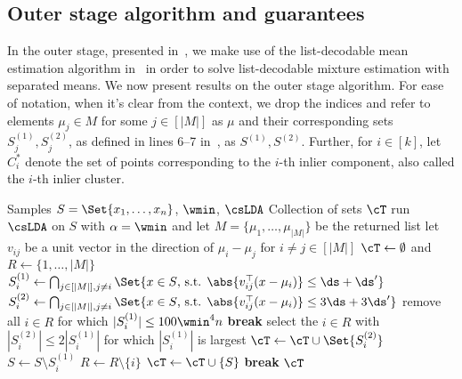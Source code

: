 \subsection{Outer stage algorithm and guarantees}
\label{sec:outer_stage_formulated}
In the outer stage, presented in~, we make use of the list-decodable mean estimation algorithm in~ in order to solve list-decodable mixture estimation with separated means. We now present results on the outer stage algorithm. 
For ease of notation, when it's clear from the context, we drop the indices and refer to elements $\mu_j \in M$ for some $j\in [|M|]$ as $\mu$ and their corresponding sets $S_j^{(1)}, S_j^{(2)}$, as defined in lines 6--7 in~, as $S^{(1)}, S^{(2)}$. 
Further, for \(i \in [k]\), let \(C_i^*\) denote the set of points corresponding to the \(i\)-th inlier component, also called the $i$-th inlier cluster.

\begin{algorithm}[t]
\caption{\(\operatorname{OuterStage}\)}
\label{alg:second_stage_pruning}
    \begin{algorithmic}[1]
        \Require Samples $S = \Set{x_1, \ldots, x_{n}}$, \(\wmin\), \(\csLDA\)
        \Ensure Collection of sets \(\cT\)
        \State run~\(\csLDA\) on $S$ with $\alpha=\wmin$ and let $M=\{\mu_1,\dots,\mu_{|M|}\}$ be the returned list
        \State let \(v_{ij}\) be a unit vector in the direction of \(\mu_i - \mu_j\) for \(i \neq j \in [|M|]\)
        \State $\cT \gets \emptyset$ and $R \gets \{1, \ldots, |M|\}$
                \State $S_{i}^{(1)} \gets \bigcap_{j \in [|M|], j \neq i}\Set{x \in S \text{, s.t. } \abs{v_{ij}^{\top}(x - \mu_i)} \leq \ds+\ds'}$
                \State $S_{i}^{(2)} \gets \bigcap_{j \in [|M|], j \neq i}\Set{x \in S \text{, s.t. } \abs{v_{ij}^{\top}(x - \mu_i)} \leq  3\ds + 3\ds'}$
            \EndFor
            \State remove all $i \in R$ for which $|S_i^{(1)}| \leq 100 \wmin^4 n$
             \textbf{break}
            \EndIf
                \State select the $i \in R$ with $|S_i^{(2)}| \leq 2|S_i^{(1)}|$ for which $|S_i^{(1)}|$ is largest
                \State \(\cT \gets \cT \cup \Set{S_i^{(2)}}\)
                \State $S \gets S \setminus S_i^{(1)}$
                \State $R \gets R \setminus \{i\}$
            \Else
                \State \(\cT \gets \cT \cup \{S\}\)
                \State \textbf{break}
            \EndIf
        \EndWhile
        \State \Return \(\cT\)
    \end{algorithmic}
\end{algorithm}

